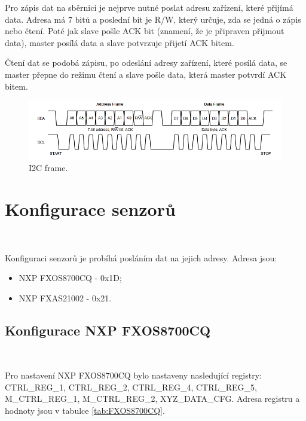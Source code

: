 Pro zápis dat na sběrnici je nejprve nutné poslat adresu zařízení, které přijímá
data. Adresa má 7 bitů a poslední bit je R/W, který určuje, zda se jedná
o zápis nebo čtení. Poté jak slave pošle ACK bit (znamení, že je připraven přijmout data), master posílá data a slave potvrzuje přijetí ACK bitem.

Čtení dat se podobá zápisu, po odeslání adresy zařízení, které posílá data,
se master přepne do režimu čtení a slave pošle data, která master potvrdí ACK bitem\cite{I2C}.

\begin{figure}[!h]
    \centering
    \includegraphics[width = 0.8\linewidth]{Figures/I2C_FRAME.png}
    \caption{I2C frame\cite{I2C}.}
    \label{fig:I2C_FRAME}
\end{figure}

\section{Konfigurace senzorů}\

Konfiguraci senzorů je probíhá posláním dat na jejich adresy. Adresa 
jsou:
\begin{itemize}
    \item NXP FXOS8700CQ - 0x1D;
    \item NXP FXAS21002 - 0x21.
\end{itemize}

\subsection{Konfigurace NXP FXOS8700CQ}\

Pro nastavení NXP FXOS8700CQ bylo nastaveny nasledující registry: CTRL\_REG\_1, CTRL\_REG\_2,
CTRL\_REG\_4, CTRL\_REG\_5, M\_CTRL\_REG\_1, M\_CTRL\_REG\_2, XYZ\_DATA\_CFG.
Adresa registru a hodnoty jsou v tabulce \ref{tab:FXOS8700CQ}.

